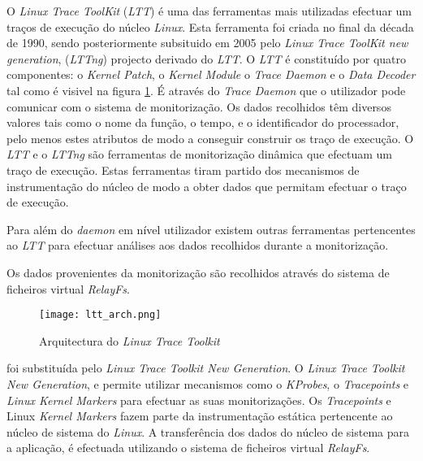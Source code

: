 
O \textit{Linux Trace ToolKit} (\textit{LTT}) é uma das ferramentas mais utilizadas efectuar um traços de execução do núcleo \textit{Linux}.
Esta ferramenta foi criada no final da década de 1990, sendo posteriormente subsituido em 2005 pelo \textit{Linux Trace ToolKit new generation}, (\textit{LTTng}) projecto derivado do \textit{LTT}.
O \textit{LTT} é constituído por quatro componentes: o \textit{Kernel Patch}, o \textit{Kernel Module} o \textit{Trace Daemon} e o \textit{Data Decoder} tal como é visivel na figura \ref{fig:ltt_arch}.
É através do \textit{Trace Daemon} que o utilizador pode comunicar com o sistema de monitorização.
Os dados recolhidos têm diversos valores tais como o nome da função, o tempo, e o identificador do processador, pelo menos estes atributos de modo a conseguir construir os traço de execução.
O \textit{LTT} e o \textit{LTTng} são ferramentas de monitorização dinâmica que efectuam um traço de execução.
Estas ferramentas tiram partido dos mecanismos de instrumentação do núcleo de modo a obter dados que permitam efectuar o traço de execução.

Para além do \textit{daemon} em nível utilizador existem outras ferramentas pertencentes ao \textit{LTT} para efectuar análises aos dados recolhidos durante a monitorização.

Os dados provenientes da monitorização são recolhidos através do sistema de ficheiros virtual \textit{RelayFs}.

\begin{figure}[!htb]
       \centering
       \texttt{[image: ltt\_arch.png]}
       \caption{Arquitectura do \textit{Linux Trace Toolkit} \cite{Yaghmour:2000:MCS:1267724.1267726}}
	\label{fig:ltt_arch}
\end{figure}

\cite{Yaghmour:2000:MCS:1267724.1267726}
foi substituída pelo \textit{Linux Trace Toolkit New Generation}.
O \textit{Linux Trace Toolkit New Generation}, e permite utilizar mecanismos como o \textit{KProbes}, o \textit{Tracepoints}\cite{Mathieu2009} e \textit{Linux Kernel Markers}\cite{Mathieu2009} para efectuar as suas monitorizações.
Os \textit{Tracepoints} e Linux \textit{Kernel Markers} fazem parte da instrumentação estática pertencente ao núcleo de sistema do \textit{Linux}.
A transferência dos dados do núcleo de sistema para a aplicação, é efectuada utilizando o sistema de ficheiros virtual \textit{RelayFs}.

